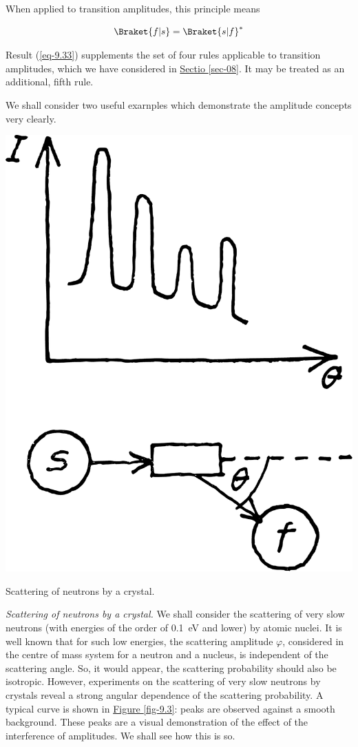 \documentclass[a4paper,sfsidenotes,colorlinks=true]{tufte-book}
\numberwithin{equation}{section}
\numberwithin{figure}{section}
\begin{document}
When applied to transition amplitudes, this principle means

\begin{equation}%
\Braket{f|s} = \Braket{s|f}^{*}
 \label{eq-9.33}
\end{equation}

Result (\ref{eq-9.33}) supplements the set of four rules applicable to transition amplitudes, which we have considered in \hyperref[sec-08]{Sectio \ref{sec-08}}. It may be treated as an additional, fifth rule.

We  shall consider two useful
exarnples which demonstrate the amplitude concepts very clearly.
\begin{marginfigure}[1cm]
\centering
\includegraphics[width=\textwidth]{figures/fig-09-03.pdf}
\caption{Scattering of neutrons by a crystal.}
\label{fig-9.3}
\end{marginfigure}
\emph{Scattering of neutrons by a crystal.} We shall consider the
scattering of very slow neutrons (with energies of the order of
\SI{0.1}{\eV} and lower) by atomic nuclei. It is well known that for
such low energies, the scattering amplitude $\varphi$, considered in the
centre of mass system for a neutron and a nucleus, is independent of
the scattering angle. So, it would appear, the scattering probability
should also be isotropic. However, experiments on the scattering of
very slow neutrons by crystals reveal a strong angular dependence of
the scattering probability. A typical curve is shown in
\hyperref[fig-9.3]{Figure \ref{fig-9.3}}: peaks are observed against a
smooth background. These peaks are a visual demonstration of the
effect of the interference of amplitudes. We shall see how this is so.
\end{document}
